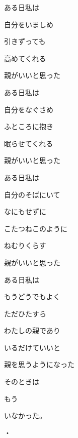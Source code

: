 
\author{Tomislav Mamić}


	
	ある日私は
	
	自分をいましめ
	
	引きずっても
	
	高めてくれる
	
	親がいいと思った
	
	\vspace{10pt}
	ある日私は
	
	自分をなぐさめ
	
	ふところに抱き
	
	眠らせてくれる
	
	親がいいと思った
	
	\vspace{10pt}
	ある日私は
	
	自分のそばにいて
	
	なにもせずに
	
	こたつねこのように
	
	ねむりくらす
	
	親がいいと思った
	
	\vspace{10pt}
	ある日私は
	
	もうどうでもよく
	
	ただひたすら
	
	わたしの親であり
	
	いるだけていいと
	
	親を思うようになった
	
	\vspace{10pt}
	そのときは
	
	もう
	
	いなかった。
	
	\vspace{20pt}
	・
